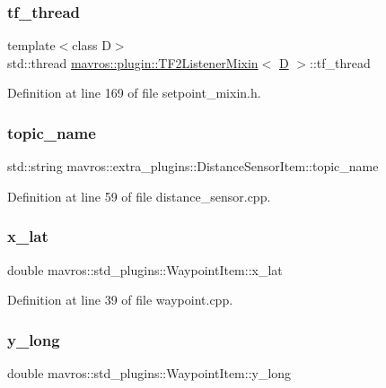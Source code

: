 \subsubsection{\texorpdfstring{tf\_thread}{tf\_thread}}
{\footnotesize\ttfamily template$<$class D$>$ \\
std\+::thread \mbox{\hyperlink{classmavros_1_1plugin_1_1TF2ListenerMixin}{mavros\+::plugin\+::\+T\+F2\+Listener\+Mixin}}$<$ \mbox{\hyperlink{mavlink__sha256_8h_af316c33cc298530f245e8b55330e86b5}{D}} $>$\+::tf\+\_\+thread}



Definition at line 169 of file setpoint\+\_\+mixin.\+h.

\mbox{\label{group__plugin_gaec60262d11a7bb202f471aa4d6608615}} 
\subsubsection{\texorpdfstring{topic\_name}{topic\_name}}
{\footnotesize\ttfamily std\+::string mavros\+::extra\+\_\+plugins\+::\+Distance\+Sensor\+Item\+::topic\+\_\+name}



Definition at line 59 of file distance\+\_\+sensor.\+cpp.

\mbox{\label{group__plugin_gacd8bc92567aa5d184991c15ad1e0823b}} 
\subsubsection{\texorpdfstring{x\_lat}{x\_lat}}
{\footnotesize\ttfamily double mavros\+::std\+\_\+plugins\+::\+Waypoint\+Item\+::x\+\_\+lat}



Definition at line 39 of file waypoint.\+cpp.

\mbox{\label{group__plugin_gac45e1689a1d68f56e3682413006287f6}} 
\subsubsection{\texorpdfstring{y\_long}{y\_long}}
{\footnotesize\ttfamily double mavros\+::std\+\_\+plugins\+::\+Waypoint\+Item\+::y\+\_\+long}



